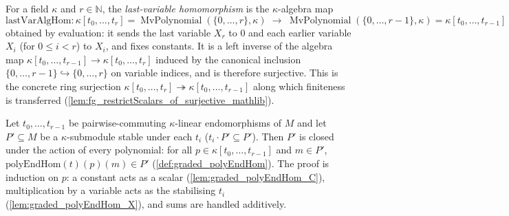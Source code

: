 \begin{definition}

  \label{lem:graded_lastVarAlgHom}
  For a field \(\kappa\) and \(r \in \mathbb{N}\), the \emph{last-variable
  homomorphism} is the \(\kappa\)-algebra map
  \[
    \mathrm{lastVarAlgHom} : \kappa[t_0, \dots, t_r]
      = \operatorname{MvPolynomial}(\{0,\dots,r\}, \kappa)
      \;\longrightarrow\;
      \operatorname{MvPolynomial}(\{0,\dots,r-1\}, \kappa) = \kappa[t_0, \dots, t_{r-1}]
  \]
  obtained by evaluation: it sends the last variable \(X_r\) to \(0\) and each
  earlier variable \(X_i\) (for \(0 \le i < r\)) to \(X_i\), and fixes constants.
  It is a left inverse of the algebra map
  \(\kappa[t_0, \dots, t_{r-1}] \to \kappa[t_0, \dots, t_r]\)
  induced by the canonical inclusion \(\{0, \dots, r-1\} \hookrightarrow \{0, \dots, r\}\)
  on variable indices, and is therefore surjective. This is the concrete
  ring surjection \(\kappa[t_0, \dots, t_r] \twoheadrightarrow
  \kappa[t_0, \dots, t_{r-1}]\) along which finiteness is transferred
  (\cref{lem:fg_restrictScalars_of_surjective_mathlib}).
\end{definition}

\begin{lemma}

  \label{lem:graded_polyEndHom_mem_of_stable}
  Let \(t_0, \dots, t_{r-1}\) be pairwise-commuting \(\kappa\)-linear endomorphisms
  of \(M\) and let \(P' \subseteq M\) be a \(\kappa\)-submodule stable under each
  \(t_i\) (\(t_i \cdot P' \subseteq P'\)). Then \(P'\) is closed under the action of
  every polynomial: for all \(p \in \kappa[t_0, \dots, t_{r-1}]\) and \(m \in P'\),
  \(\mathrm{polyEndHom}(t)(p)(m) \in P'\) (\cref{def:graded_polyEndHom}). The proof
  is induction on \(p\): a constant acts as a scalar (\cref{lem:graded_polyEndHom_C}),
  multiplication by a variable acts as the stabilising \(t_i\)
  (\cref{lem:graded_polyEndHom_X}), and sums are handled additively.
\end{lemma}


